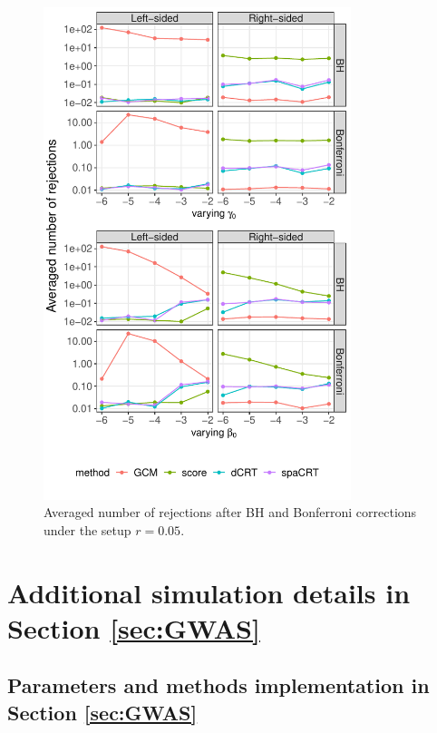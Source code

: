 \documentclass[12pt]{article}
\theoremstyle{definition}
\begin{document}
  
  \begin{figure}[!ht]
    \centering
    \includegraphics[width=0.8\textwidth]{figures-and-tables/simulation/NB-regression/FDR/disp-0.05-multiple_testing_rejection_plot.pdf}
    \caption{Averaged number of rejections after BH and Bonferroni corrections under the setup $r=0.05$.}
    \label{fig:simulation-CRISPR-screens-high-multiplicity-disp-0.05}
  \end{figure}
  
  
\clearpage

\section{Additional simulation details in Section \ref{sec:GWAS}}\label{sec:additional_details_GWAS}



\subsection{Parameters and methods implementation in Section \ref{sec:GWAS}}\label{sec:simulation_methods_GWAS}
\end{document}
